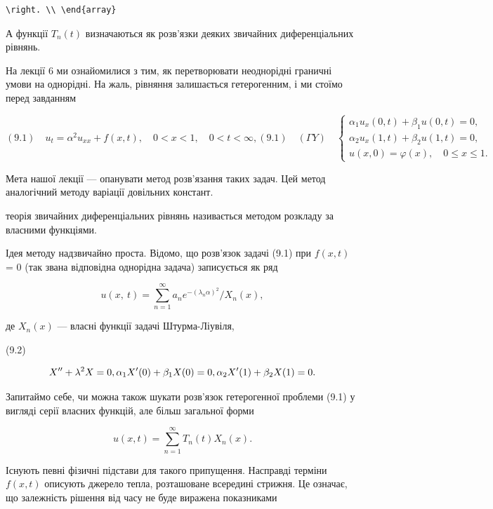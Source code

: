 \documentclass[
  ukrainian,
]{article}
\begin{document}
\begin{verbatim}
\right. \\ \end{array}
\end{verbatim}

А функції \(T_n(t)\) визначаються як розв'язки деяких звичайних
диференціальних рівнянь.

На лекції 6 ми ознайомилися з тим, як перетворювати неоднорідні граничні
умови на однорідні. На жаль, рівняння залишається гетерогенним, і ми
стоїмо перед завданням

\[
(9.1) \quad u_{t} = \alpha^{2} u_{xx} + f(x, t), \quad 0 < x < 1, \quad 0 < t < \infty,
(9.1) \quad (\Gamma Y) \quad
\begin{cases} \alpha_{1} u_{x}(0, t) + \beta_{1} u(0, t) = 0, \\ \alpha_{2} u_{x}(1, t) + \beta_{2} u(1, t) = 0, \\ u(x, 0) = \varphi(x), \quad 0 \le x \le 1. \end{cases}
\]

Мета нашої лекції --- опанувати метод розв'язання таких задач. Цей метод
аналогічний методу варіації довільних констант.

теорія звичайних диференціальних рівнянь називається методом розкладу за
власними функціями.

Ідея методу надзвичайно проста. Відомо, що розв'язок задачі (9.1) при
\(f(x, t)\) = 0 (так звана відповідна однорідна задача) записується як
ряд

\[
u\left(x,\ t\right)=\sum_{n=1}^{\infty}a_{n}e^{-\left(\lambda_{n}\alpha\right)^{2}}/X_{n}\left(x\right),
\]

де \(X_n(x)\) --- власні функції задачі Штурма-Ліувіля,

(9.2)

\[
X'' + \lambda^2 X = 0, \\ \alpha_1 X'(0) + \beta_1 X(0) = 0, \\ \alpha_2 X'(1) + \beta_2 X(1) = 0.
\]

Запитаймо себе, чи можна також шукати розв'язок гетерогенної проблеми
(9.1) у вигляді серії власних функцій, але більш загальної форми

\[
u(x, t) = \sum_{n=1}^{\infty} T_n(t) X_n(x).
\]

Існують певні фізичні підстави для такого припущення. Насправді терміни
\(f(x,t)\) описують джерело тепла, розташоване всередині стрижня. Це
означає, що залежність рішення від часу не буде виражена показниками
\end{document}
